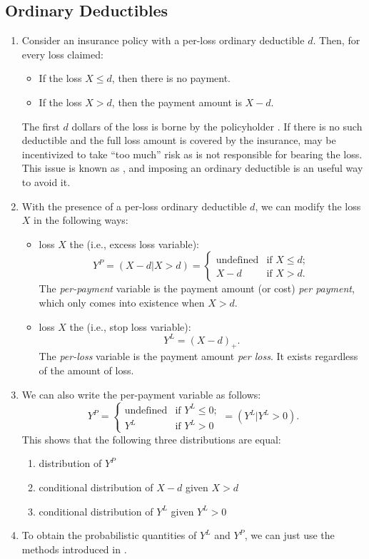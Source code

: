 \subsection{Ordinary Deductibles}
\begin{enumerate}
\item Consider an insurance policy with a per-loss ordinary deductible
\(d\). Then, for every loss claimed:
\begin{itemize}
\item If the loss \(X\le d\), then there is no payment.
\item If the loss \(X>d\), then the payment amount is \(X-d\).
\end{itemize}
The first \(d\) dollars of the loss  is borne by the
policyholder . If there is no such
deductible and the full loss amount is covered by the insurance, 
may be incentivized to take ``too much'' risk as  is not
responsible for bearing the loss. This issue is known as ,
and imposing an ordinary deductible is an useful way to avoid it.

\item With the presence of a per-loss ordinary deductible \(d\), we can modify
the loss \(X\) in the following ways:
\begin{itemize}
\item loss \(X\)  the  (i.e.,
excess loss variable):
\[
Y^P=(X-d|X>d)=\begin{cases}
\text{undefined}&\text{if \(X\le d\)};\\
X-d&\text{if \(X>d\)}.
\end{cases}
\]
The \emph{per-payment} variable is the payment amount (or cost) \emph{per
payment}, which only comes into existence when \(X>d\).
\item loss \(X\)  the  (i.e., stop
loss variable):
\[
Y^L=(X-d)_{+}.
\]
The \emph{per-loss} variable is the payment amount \emph{per loss}. It exists
regardless of the amount of loss.
\end{itemize}
\item
We can also write the per-payment variable as follows:
\[
Y^P=\begin{cases}
\text{undefined}&\text{if \(Y^L\le 0\)};\\
Y^L&\text{if \(Y^L>0\)}
\end{cases}
=\boxed{(Y^L|Y^L>0)}.
\]
This shows that the following three distributions are equal:
\begin{enumerate}
\item distribution of \(Y^P\)
\item conditional distribution of \(X-d\) given \(X>d\)
\item conditional distribution of \(Y^L\) given \(Y^L>0\)
\end{enumerate}

\item To obtain the probabilistic quantities of \(Y^L\) and \(Y^P\), we can
just use the methods introduced in .
\end{enumerate}

